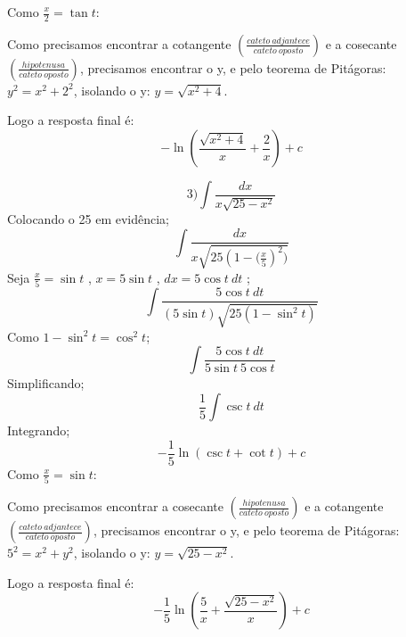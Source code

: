 \documentclass[fleqn, twocolumn]{article}
\begin{document}
    Como $\frac{x}{2} = \tan{t}$:


    Como precisamos encontrar a cotangente $(\frac{cateto\ adjantece}{cateto\ oposto})$ e a cosecante $(\frac{hipotenusa}{cateto\ oposto})$, precisamos encontrar o y, e pelo teorema
de Pitágoras: $y^2 = x^2 + 2^2$, isolando o y: $y = \sqrt{x^2 +4}$.
   
    Logo a resposta final é: \[-\ln(\frac{\sqrt{x^2 +4}}{x} + \frac{2}{x})+c \]

    \[3) \int \frac{dx}{x \sqrt{25-x^2}}  \]
    Colocando o 25 em evidência;
        \[ \int \frac{dx}{x \sqrt{25(1-{(\frac{x}{5}})^2)}}\]
    Seja $\frac{x}{5} = \sin{t}$ , $x = 5 \sin{t}$ , $ dx = 5\cos{t}\ dt$ ;
        \[ \int \frac{5\cos{t}\ dt}{(5\sin{t}) \sqrt{25(1-{\sin^2{t}})}}\]
    Como $1-\sin^2{t} = \cos^2{t}$;
        \[ \int \frac{5\cos{t}\ dt}{5 \sin{t}\ 5\cos{t}} \]
    Simplificando;
        \[\frac{1}{5}\int \csc{t}\ dt \]
    Integrando;
        \[-\frac{1}{5} \ln(\csc{t} + \cot{t}) + c\]
    Como $\frac{x}{5} = \sin{t}$:
 

    Como precisamos encontrar a cosecante $(\frac{hipotenusa}{cateto\ oposto})$ e a cotangente $(\frac{cateto\ adjantece}{cateto\ oposto})$, precisamos encontrar o y, e pelo teorema
de Pitágoras: $5^2 = x^2 + y^2$, isolando o y: $y = \sqrt{25-x^2}$.
   
    Logo a resposta final é: \[-\frac{1}{5} \ln( \frac{5}{x} + \frac{\sqrt{25-x^2}}{x} ) +c\]
\end{document}
